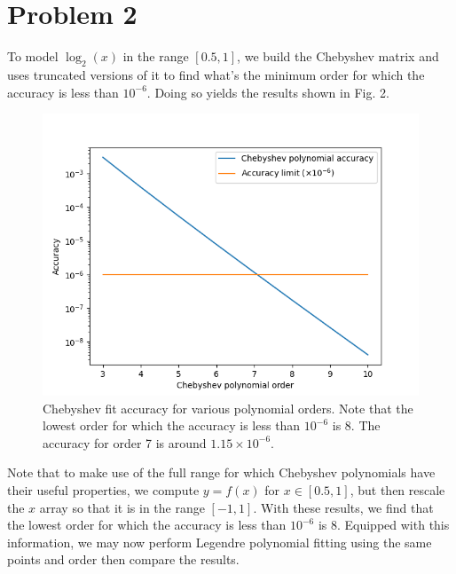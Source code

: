 \documentclass{article}
\begin{document}
\section*{Problem 2}
To model $\log_2(x)$ in the range $[0.5, 1]$, we build the Chebyshev matrix and uses truncated versions of it to find what's the minimum order for which the accuracy is less than $10^{-6}$. Doing so yields the results shown in Fig. 2.
\begin{figure}[h]
    \centering
    \includegraphics[scale=0.55]{images/prob2_cheb_acc.png}
    \caption{Chebyshev fit accuracy for various polynomial orders. Note that the lowest order for which the accuracy is less than $10^{-6}$ is 8. The accuracy for order 7 is around $1.15 \times 10^{-6}$.}
\end{figure}

Note that to make use of the full range for which Chebyshev polynomials have their useful properties, we compute $y=f(x)$ for $x \in [0.5, 1]$, but then rescale the $x$ array so that it is in the range $[-1, 1]$. With these results, we find that the lowest order for which the accuracy is less than $10^{-6}$ is 8. Equipped with this information, we may now perform Legendre polynomial fitting using the same points and order then compare the results.
\end{document}
